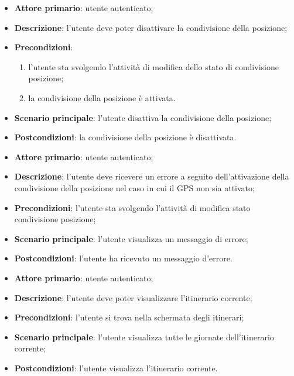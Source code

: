 \label{uc:dis_pos}
\begin{itemize}
	\item \textbf{Attore primario}: utente autenticato;
	\item \textbf{Descrizione}: l'utente deve poter disattivare la condivisione della posizione;
	\item \textbf{Precondizioni}: 
	\begin{enumerate}
		\item l'utente sta svolgendo l'attività di modifica dello stato di condivisione posizione;
		\item la condivisione della posizione è attivata.
	\end{enumerate}
    \item \textbf{Scenario principale}: l'utente disattiva la condivisione della posizione;
	\item \textbf{Postcondizioni}: la condivisione della posizione è disattivata.
\end{itemize}

\label{uc:gps_err}
\begin{itemize}
    \item \textbf{Attore primario}: utente autenticato;
    \item \textbf{Descrizione}: l'utente deve ricevere un errore a seguito dell'attivazione della condivisione della posizione nel caso in cui il GPS non sia attivato;
    \item \textbf{Precondizioni}: l'utente sta svolgendo l'attività di modifica stato condivisione posizione;
    \item \textbf{Scenario principale}: l'utente visualizza un messaggio di errore;
    \item \textbf{Postcondizioni}: l'utente ha ricevuto un messaggio d'errore.
\end{itemize}

\label{uc:vis_it}
\begin{itemize}
	\item \textbf{Attore primario}: utente autenticato;
	\item \textbf{Descrizione}: l'utente deve poter visualizzare l'itinerario corrente;
	\item \textbf{Precondizioni}: l'utente si trova nella schermata degli itinerari;
	\item \textbf{Scenario principale}: l'utente visualizza tutte le giornate dell'itinerario corrente;
	\item \textbf{Postcondizioni}: l'utente visualizza l'itinerario corrente.
\end{itemize}


